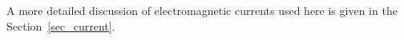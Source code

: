 A more detailed discussion of electromagnetic currents used here is given 
in the Section~\ref{sec_current}.





